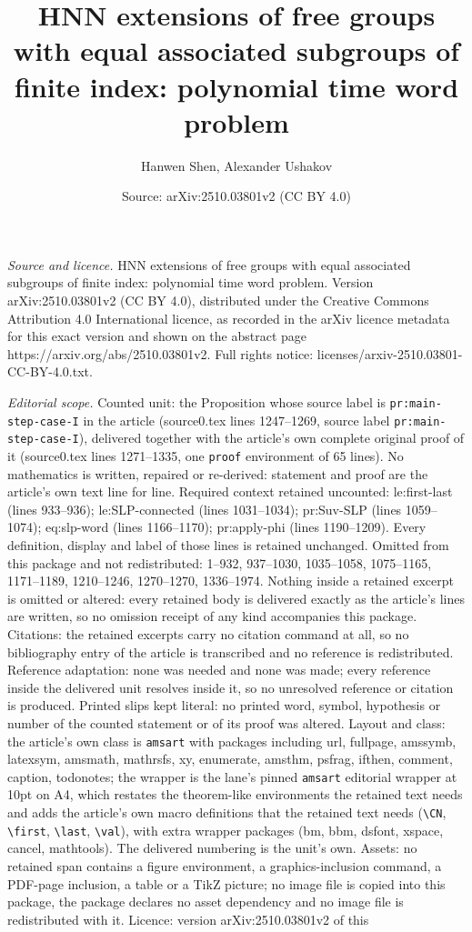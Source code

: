 \documentclass[10pt,a4paper]{amsart}
\title[HNN extensions of free groups with equal associated subgroup]{HNN extensions of free groups with equal associated subgroups of finite index: polynomial time word problem}
\author{Hanwen Shen, Alexander Ushakov}
\date{Source: arXiv:2510.03801v2 (CC BY 4.0)}
\begin{document}
\maketitle

\noindent\emph{Source and licence.} HNN extensions of free groups with equal associated subgroups of finite index: polynomial time word problem. Version arXiv:2510.03801v2 (CC BY 4.0), distributed under the Creative Commons Attribution 4.0 International licence, as recorded in the arXiv licence metadata for this exact version and shown on the abstract page https://arxiv.org/abs/2510.03801v2. Full rights notice: licenses/arxiv-2510.03801-CC-BY-4.0.txt.\par\smallskip

\noindent\textit{Editorial scope.} Counted unit: the Proposition whose source label is \texttt{pr:main-step-case-I} in the article (source0.tex lines 1247--1269, source label \texttt{pr:main-step-case-I}), delivered together with the article's own complete original proof of it (source0.tex lines 1271--1335, one \texttt{proof} environment of 65 lines). No mathematics is written, repaired or re-derived: statement and proof are the article's own text line for line. Required context retained uncounted: le:first-last (lines 933--936); le:SLP-connected (lines 1031--1034); pr:Suv-SLP (lines 1059--1074); eq:slp-word (lines 1166--1170); pr:apply-phi (lines 1190--1209). Every definition, display and label of those lines is retained unchanged. Omitted from this package and not redistributed: 1--932, 937--1030, 1035--1058, 1075--1165, 1171--1189, 1210--1246, 1270--1270, 1336--1974. Nothing inside a retained excerpt is omitted or altered: every retained body is delivered exactly as the article's lines are written, so no omission receipt of any kind accompanies this package. Citations: the retained excerpts carry no citation command at all, so no bibliography entry of the article is transcribed and no reference is redistributed. Reference adaptation: none was needed and none was made; every reference inside the delivered unit resolves inside it, so no unresolved reference or citation is produced. Printed slips kept literal: no printed word, symbol, hypothesis or number of the counted statement or of its proof was altered. Layout and class: the article's own class is \texttt{amsart} with packages including url, fullpage, amssymb, latexsym, amsmath, mathrsfs, xy, enumerate, amsthm, psfrag, ifthen, comment, caption, todonotes; the wrapper is the lane's pinned \texttt{amsart} editorial wrapper at 10pt on A4, which restates the theorem-like environments the retained text needs and adds the article's own macro definitions that the retained text needs (\texttt{\textbackslash CN}, \texttt{\textbackslash first}, \texttt{\textbackslash last}, \texttt{\textbackslash val}), with extra wrapper packages (bm, bbm, dsfont, xspace, cancel, mathtools). The delivered numbering is the unit's own. Assets: no retained span contains a figure environment, a graphics-inclusion command, a PDF-page inclusion, a table or a TikZ picture; no image file is copied into this package, the package declares no asset dependency and no image file is redistributed with it. Licence: version arXiv:2510.03801v2 of this 
\end{document}
